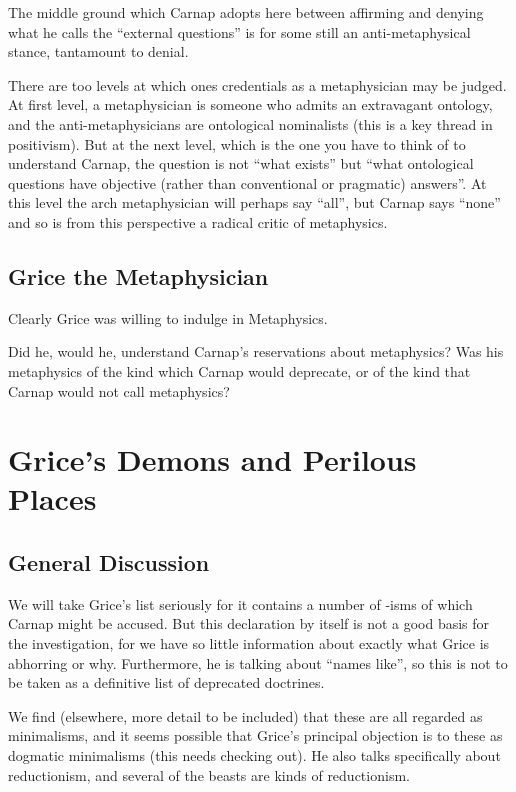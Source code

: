 \documentclass[10pt,titlepage]{book}
\begin{document}
The middle ground which Carnap adopts here between affirming and denying what he calls the ``external questions'' is for some still an anti-metaphysical stance, tantamount to denial.

There are too levels at which ones credentials as a metaphysician may be judged.
At first level, a metaphysician is someone who admits an extravagant ontology, and the anti-metaphysicians are ontological nominalists (this is a key thread in positivism).
But at the next level, which is the one you have to think of to understand Carnap, the question is not ``what exists'' but ``what ontological questions have objective (rather than conventional or pragmatic) answers''.
At this level the arch metaphysician will perhaps say ``all'', but Carnap says ``none'' and so is from this perspective a radical critic of metaphysics.

\subsection{Grice the Metaphysician}

Clearly Grice was willing to indulge in Metaphysics.

Did he, would he, understand Carnap's reservations about metaphysics?
Was his metaphysics of the kind which Carnap would deprecate, or of the kind that Carnap would not call metaphysics?


\section{Grice's Demons and Perilous Places}


\subsection{General Discussion}

We will take Grice's list seriously for it contains a number of -isms of which Carnap might be accused.
But this declaration by itself is not a good basis for the investigation, for we have so little information about exactly what Grice is abhorring or why.
Furthermore, he is talking about ``names like'', so this is not to be taken as a definitive list of deprecated doctrines.

We find (elsewhere, more detail to be included) that these are all regarded as minimalisms, and it seems possible that Grice's principal objection is to these as dogmatic minimalisms (this needs checking out).
He also talks specifically about reductionism, and several of the beasts are kinds of reductionism.
\end{document}
